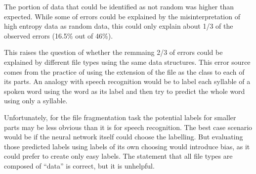 The portion of data that could be identified as not random was higher than expected. While some of errors could be explained by the misinterpretation of high entropy data as random data, this could only explain about 1/3 of the observed errors (16.5\% out of 46\%).

This raises the question of whether the remmaing 2/3 of errors could be explained by different file types using the same data structures. This error source comes from the practice of using the extension of the file as the class to each of its parts. An analogy with speech recognition would be to label each syllable of a spoken word using the word as its label and then try to predict the whole word using only a syllable.

Unfortunately, for the file fragmentation task the potential labels for smaller parts may be less obvious than it is for speech recognition. The best case scenario would be if the neural network itself could choose the labelling. But evaluating those predicted labels using labels of its own choosing would introduce bias, as it could prefer to create only easy labels. The statement that all file types are composed of ``data'' is correct, but it is unhelpful.





